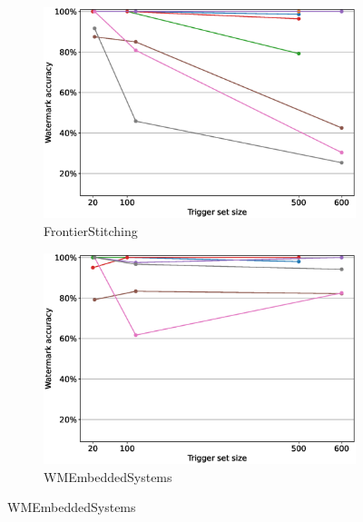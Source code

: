 \begin{figure}
\begin{subfigure}{0.4\linewidth}
        \includegraphics[width=\linewidth]{images/pruning/per_method/FrontierStitching_pruning_per_method_maximal_pr_rate.eps}
        \caption{FrontierStitching}
        \label{fig:pruning-max-pr-rate-frontier}
    \end{subfigure}
    \quad
    \begin{subfigure}{0.4\linewidth}
        \includegraphics[width=\linewidth]{images/pruning/per_method/WMEmbeddedSystems_pruning_per_method_maximal_pr_rate.eps}
        \caption{WMEmbeddedSystems}
        \label{fig:pruning-max-pr-rate-embedded}
    \end{subfigure}
    \quad


\end{figure}
